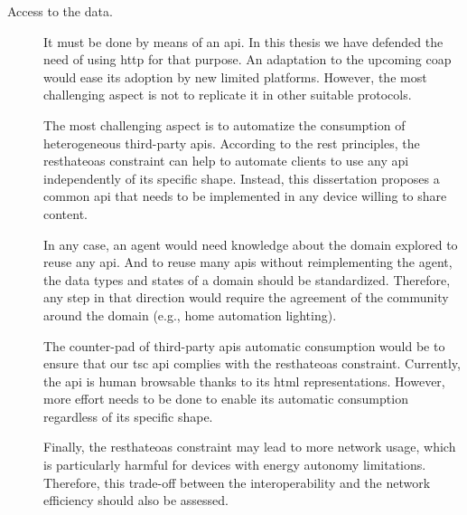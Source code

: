 \begin{description}
  \item[Access to the data.] It must be done by means of an \ac{api}.
			    In this thesis we have defended the need of using \ac{http} for that purpose.
			    An adaptation to the upcoming \ac{coap} would ease its adoption by new limited platforms. %
			    However, the most challenging aspect is not to replicate it in other suitable protocols.
			    
			    The most challenging aspect is to automatize the consumption of heterogeneous third-party \acp{api}.
			    According to the \ac{rest} principles, the \ac{resthateoas} constraint can help to automate clients to use any \ac{api} independently of its specific shape. %
			    Instead, this dissertation proposes a common \ac{api} that needs to be implemented in any device willing to share content. %
			    
			    In any case, an agent would need knowledge about the domain explored to reuse any \ac{api}.
			    And to reuse many \acp{api} without reimplementing the agent, the data types and states of a domain should be standardized. %
			    Therefore, any step in that direction would require the agreement of the community around the domain (e.g., home automation lighting).
			    
			    The counter-pad of third-party \acp{api} automatic consumption would be to ensure that our \ac{tsc} \ac{api} complies with the \ac{resthateoas} constraint.
			    Currently, the \ac{api} is human browsable thanks to its \ac{html} representations.
			    However, more effort needs to be done to enable its automatic consumption regardless of its specific shape. %
			    
			    Finally, the \ac{resthateoas} constraint may lead to more network usage, which is particularly harmful for devices with energy autonomy limitations.
			    Therefore, this trade-off between the interoperability and the network efficiency should also be assessed.
			    

\end{description}
